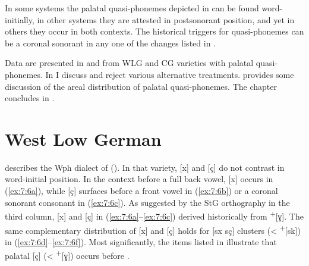 In some systems the palatal quasi-phonemes depicted in  can be found word-initially, in other systems they are attested in postsonorant position, and yet in others they occur in both contexts. The historical triggers for quasi-phonemes can be a coronal sonorant in any one of the changes listed in .

Data are presented in  and  from WLG and CG varieties with palatal quasi-phonemes. In  I discuss and reject various alternative treatments.  provides some discussion of the areal distribution of palatal quasi-phonemes. The chapter concludes in .\largerpage[-2]

\section{{West} {Low} {German}}\label{sec:7.2}\largerpage[-2]

\citet{Arens1908} describes the Wph dialect of  (). In that variety, [x] and [ç] do not contrast in word-initial position. In the context before a full back vowel, [x] occurs in (\ref{ex:7:6a}), while [ç] surfaces before a front vowel in (\ref{ex:7:6b}) or a coronal sonorant consonant in (\ref{ex:7:6c}). As suggested by the StG orthography in the third column, [x] and [ç] in (\ref{ex:7:6a}--\ref{ex:7:6c}) derived historically from  \textsuperscript{+}[ɣ]. The same complementary distribution of [x] and [ç] holds for [sx sç] clusters (< \textsuperscript{+}[sk]) in (\ref{ex:7:6d}--\ref{ex:7:6f}). Most significantly, the items listed in  illustrate that palatal [ç] (< \textsuperscript{+}[ɣ]) occurs before .

